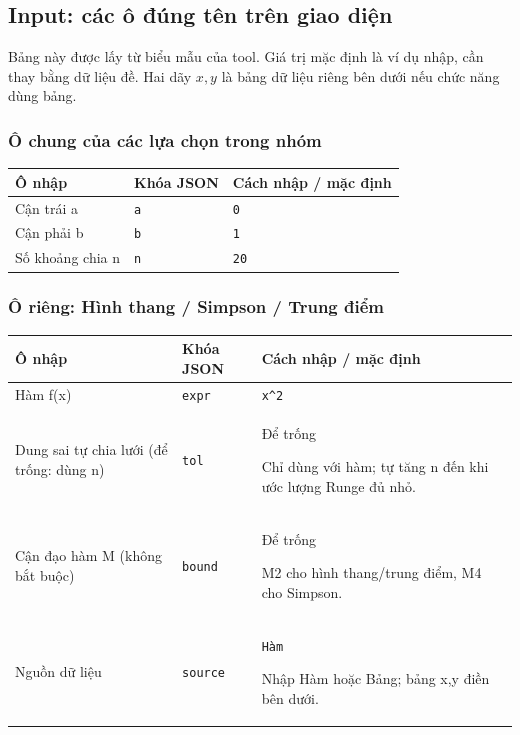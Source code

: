 \subsection*{Input: các ô đúng tên trên giao diện}
Bảng này được lấy từ biểu mẫu của tool. Giá trị mặc định là ví dụ nhập, cần thay bằng dữ liệu đề. Hai dãy $x,y$ là bảng dữ liệu riêng bên dưới nếu chức năng dùng bảng.
\subsubsection*{Ô chung của các lựa chọn trong nhóm}
\begin{center}\small\begin{tabular}{@{}p{.32\linewidth}p{.17\linewidth}p{.43\linewidth}@{}}\toprule
Ô nhập & Khóa JSON & Cách nhập / mặc định\\\midrule
Cận trái a & \texttt{a} & \texttt{0}\\[3pt]
Cận phải b & \texttt{b} & \texttt{1}\\[3pt]
Số khoảng chia n & \texttt{n} & \texttt{20}\\[3pt]
\bottomrule\end{tabular}\end{center}
\subsubsection*{Ô riêng: Hình thang /\allowbreak{} Simpson /\allowbreak{} Trung điểm}
\begin{center}\small\begin{tabular}{@{}p{.32\linewidth}p{.17\linewidth}p{.43\linewidth}@{}}\toprule
Ô nhập & Khóa JSON & Cách nhập / mặc định\\\midrule
Hàm f(x) & \texttt{expr} & \texttt{x\textasciicircum{}2}\\[3pt]
Dung sai tự chia lưới (để trống: dùng n) & \texttt{tol} & Để trống
\par Chỉ dùng với hàm;\allowbreak{} tự tăng n đến khi ước lượng Runge đủ nhỏ.\\[3pt]
Cận đạo hàm M (không bắt buộc) & \texttt{bound} & Để trống
\par M2 cho hình thang/\allowbreak{}trung điểm,\allowbreak{} M4 cho Simpson.\\[3pt]
Nguồn dữ liệu & \texttt{source} & \texttt{Hàm}
\par Nhập Hàm hoặc Bảng;\allowbreak{} bảng x,\allowbreak{}y điền bên dưới.\\[3pt]
\bottomrule\end{tabular}\end{center}
